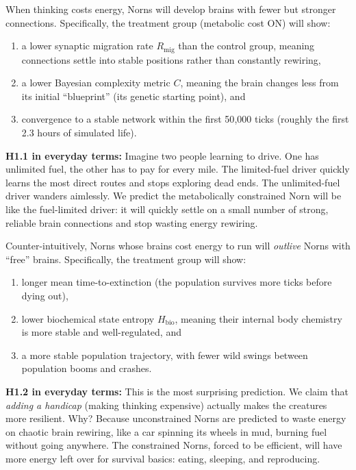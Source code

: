 \documentclass[12pt, a4paper]{article}
\newcommand{\Hbio}{H_{\mathrm{bio}}}
\newcommand{\Rmig}{R_{\mathrm{mig}}}
\begin{document}
\begin{description}[style=nextline, font=\bfseries]
  \item[H1.1: The Brain Becomes Leaner (Synaptic Sparsification)]
    When thinking costs energy, Norns will develop brains with fewer but stronger connections. Specifically, the treatment group (metabolic cost ON) will show:
    \begin{enumerate}[label=(\roman*), nosep]
      \item a lower synaptic migration rate $\Rmig$ than the control group, meaning connections settle into stable positions rather than constantly rewiring,
      \item a lower Bayesian complexity metric $C$, meaning the brain changes less from its initial ``blueprint'' (its genetic starting point), and
      \item convergence to a stable network within the first 50{,}000 ticks (roughly the first 2.3 hours of simulated life).
    \end{enumerate}

    \begin{plainbox}
    \textbf{H1.1 in everyday terms:} Imagine two people learning to drive. One has unlimited fuel, the other has to pay for every mile. The limited-fuel driver quickly learns the most direct routes and stops exploring dead ends. The unlimited-fuel driver wanders aimlessly. We predict the metabolically constrained Norn will be like the fuel-limited driver: it will quickly settle on a small number of strong, reliable brain connections and stop wasting energy rewiring.
    \end{plainbox}

  \item[H1.2: Constrained Creatures Survive Longer]
    Counter-intuitively, Norns whose brains cost energy to run will \emph{outlive} Norns with ``free'' brains. Specifically, the treatment group will show:
    \begin{enumerate}[label=(\roman*), nosep]
      \item longer mean time-to-extinction (the population survives more ticks before dying out),
      \item lower biochemical state entropy $\Hbio$, meaning their internal body chemistry is more stable and well-regulated, and
      \item a more stable population trajectory, with fewer wild swings between population booms and crashes.
    \end{enumerate}

    \begin{plainbox}
    \textbf{H1.2 in everyday terms:} This is the most surprising prediction. We claim that \emph{adding a handicap} (making thinking expensive) actually makes the creatures more resilient. Why? Because unconstrained Norns are predicted to waste energy on chaotic brain rewiring, like a car spinning its wheels in mud, burning fuel without going anywhere. The constrained Norns, forced to be efficient, will have more energy left over for survival basics: eating, sleeping, and reproducing.
    \end{plainbox}
\end{description}
\end{document}
